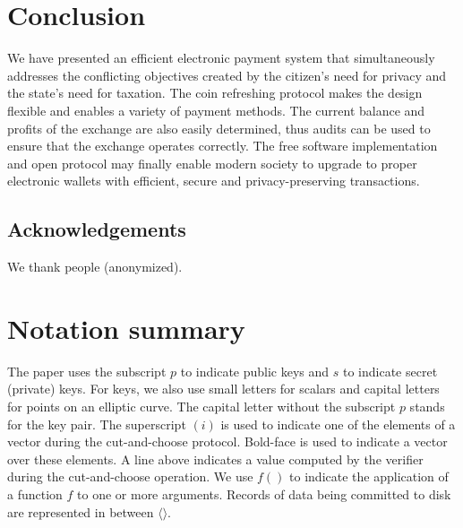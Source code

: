 \documentclass{llncs}
\begin{document}
\section{Conclusion}

We have presented an efficient electronic payment system that
simultaneously addresses the conflicting objectives created by the
citizen's need for privacy and the state's need for taxation.  The
coin refreshing protocol makes the design flexible and enables a
variety of payment methods.  The current balance and profits of the
exchange are also easily determined, thus audits can be used to ensure
that the exchange operates correctly.  The free software
implementation and open protocol may finally enable modern society to
upgrade to proper electronic wallets with efficient, secure and
privacy-preserving transactions.

\subsection*{Acknowledgements}

We thank people (anonymized).
\newpage





\newpage
\appendix

\section{Notation summary}

The paper uses the subscript $p$ to indicate public keys and $s$ to
indicate secret (private) keys.  For keys, we also use small letters
for scalars and capital letters for points on an elliptic curve.  The
capital letter without the subscript $p$ stands for the key pair.  The
superscript $(i)$ is used to indicate one of the elements of a vector
during the cut-and-choose protocol.  Bold-face is used to indicate a
vector over these elements.  A line above indicates a value computed
by the verifier during the cut-and-choose operation.  We use $f()$ to
indicate the application of a function $f$ to one or more arguments. Records of
data being committed to disk are represented in between $\langle\rangle$.
\end{document}
